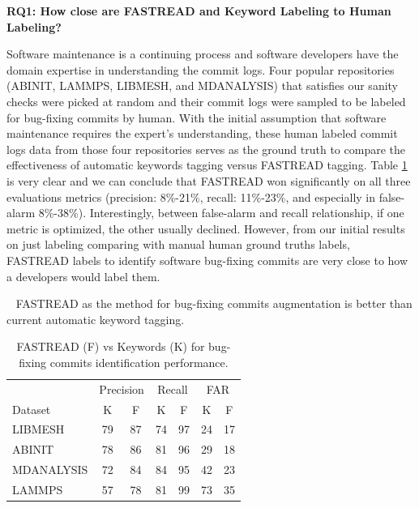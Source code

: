 \documentclass[10pt,conference]{IEEEtran}
\newenvironment{RQ}[1]%
{\noindent\begin{minipage}[c]{\linewidth}%
\begin{bclogo}[couleur=gray!25,%
                arrondi=0.1,%
                logo=\bctrombone,%
                ombre=true]{~#1}}%
{\end{bclogo}\end{minipage}\vspace{2mm}}
\begin{document}
\textbf{RQ1: { How close are FASTREAD and Keyword Labeling to Human Labeling?}}
 
Software maintenance is a continuing process and software developers have the domain expertise in understanding the commit logs. Four popular repositories (ABINIT, LAMMPS, LIBMESH, and MDANALYSIS) that satisfies our sanity checks were picked at random and their commit logs were sampled to be labeled for bug-fixing commits by human. With the initial assumption that software maintenance requires the expert's understanding, these human labeled commit logs data from those four repositories serves as the ground truth to compare the effectiveness of automatic keywords tagging versus FASTREAD tagging. Table \ref{tab:rq1} is very clear and we can conclude that FASTREAD won significantly on all three evaluations metrics (precision: 8\%-21\%, recall: 11\%-23\%, and especially in false-alarm 8\%-38\%). Interestingly, between false-alarm and recall relationship, if one metric is optimized, the other usually declined. However, from our initial results on just labeling comparing with manual human ground truths labels, FASTREAD labels to identify software bug-fixing commits are very close to how a developers would label them. 

\begin{RQ}{}
\vspace{-10pt}
FASTREAD as the method for bug-fixing commits augmentation is better than current automatic keyword tagging.
\end{RQ}


\begin{table}[!t]
\caption{FASTREAD (F) vs Keywords (K) for bug-fixing commits identification performance.}
\label{tab:rq1}
\begin{center}
\setlength\tabcolsep{10pt}
\begin{tabular}{ l|c|c|c|c|c|c }
 \multicolumn{1}{c|}{} & \multicolumn{2}{c|}{Precision} & \multicolumn{2}{c|}{Recall} & \multicolumn{2}{c}{FAR}\\
\cline{2-7}
 Dataset & K & F & K & F & K & F \\
\hline
LIBMESH & 79 & 87 & 74 & 97 & 24 & 17 \\
ABINIT & 78 & 86 &  81 & 96 & 29 & 18 \\
MDANALYSIS & 72 & 84  & 84 & 95 & 42 & 23 \\
LAMMPS & 57 & 78  & 81 & 99 & 73 & 35 \\
\end{tabular}
\end{center}
\end{table}
\end{document}
